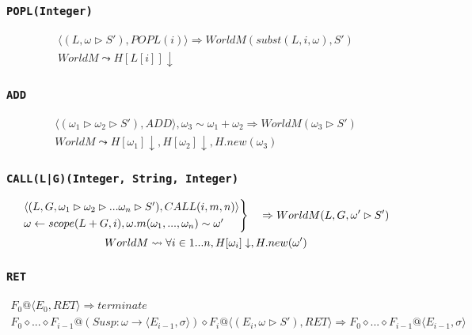 \documentclass[]{article}
\numberwithin{equation}{section}
\numberwithin{figure}{section}
\numberwithin{table}{section}
\begin{document}
\subsubsection{\texttt{POPL(Integer)}}\label{poplinteger}

\begin{gather*}
  \langle (L, \omega \rhd S'), POPL(i)\rangle \Rightarrow WorldM (subst(L, i, \omega), S' )\\
  WorldM \leadsto H[L[i]] \downarrow
\end{gather*}

\subsubsection{\texttt{ADD}}\label{add}

\begin{gather*}
  \langle (\omega_1 \rhd \omega_2 \rhd S'), ADD\rangle, \omega_3 \sim \omega_1 + \omega_2 \Rightarrow WorldM (\omega_3 \rhd S')\\
  WorldM \leadsto H[\omega_1] \downarrow, H[\omega_2] \downarrow, H.new(\omega_3)
\end{gather*}

\subsubsection{\texttt{CALL(L|G)(Integer, String, Integer)}}\label{callinteger-string-integer}

\begin{gather*}
  \begin{rcases}
    \langle (L, G, \omega_1 \rhd \omega_2 \rhd ... \omega_n \rhd S'), CALL(i, m, n)\rangle\\
    \omega \leftarrow scope(L + G, i), \omega.m(\omega_1, ..., \omega_n) \sim \omega'
  \end{rcases}
  \quad
    \Rightarrow WorldM (L, G, \omega' \rhd S' )\\
  WorldM \leadsto \forall i \in 1...n, H[\omega_i] \downarrow, H.new(\omega')
\end{gather*}

\subsubsection{\texttt{RET}}\label{ret}

\begin{gather*}
  F_0@\langle E_0, RET\rangle \Rightarrow terminate \\
  F_0 \diamond ... \diamond F_{i - 1}@(Susp: \omega \rightarrow \langle E_{i-1}, \sigma \rangle)\diamond F_i@\langle (E_i, \omega \rhd S'), RET\rangle \Rightarrow F_0 \diamond ... \diamond F_{i-1}@ \langle E_{i-1}, \sigma \rangle
\end{gather*}
\end{document}
